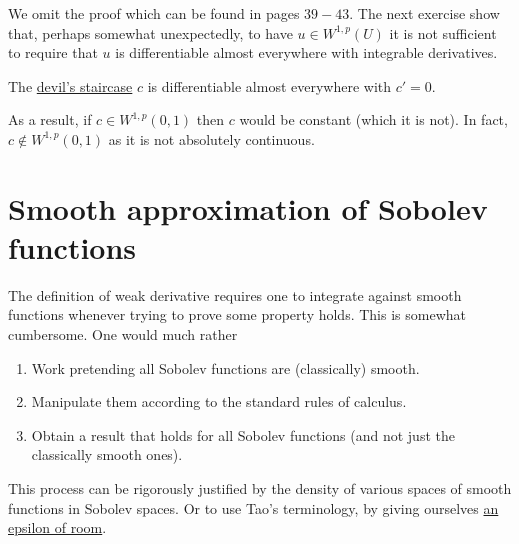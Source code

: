 \documentclass[
    a4paper,
    DIV=14,
    abstract=true,
    numbers=noenddot
]{scrartcl}
\begin{document}
We omit the proof which can be found in \cite{Juha2023} pages $39-43$. The next exercise show that, perhaps somewhat unexpectedly, to have $u \in  W^{1,p}(U)$ it is not sufficient to require that $u$ is differentiable almost everywhere with integrable derivatives.
\begin{example}
	The \href{https://en.wikipedia.org/wiki/Cantor_function}{devil's staircase} $c$ is differentiable almost everywhere with $c'=0$. \end{example}
As a result, if $c \in W^{1,p}(0,1)$ then $c$ would be constant (which it is not). In fact, $c \not\in W^{1,p}(0,1)$ as it is not absolutely continuous.




\section{Smooth approximation of Sobolev functions}\label{approxsec}
The definition of weak derivative requires one to integrate against smooth functions whenever trying to prove some property holds. This is somewhat cumbersome. One would much rather
\begin{enumerate}
	\item Work pretending all Sobolev functions are (classically) smooth.
	\item Manipulate them according to the standard rules of calculus.
	\item Obtain a result that holds for all Sobolev functions (and not just the classically smooth ones).\end{enumerate}
This process can be rigorously justified by the density of various spaces of smooth functions in Sobolev spaces. Or to use Tao's terminology, by giving ourselves \href{https://terrytao.wordpress.com/2009/02/28/tricks-wiki-give-yourself-an-epsilon-of-room/}{an epsilon of room}.
\end{document}
